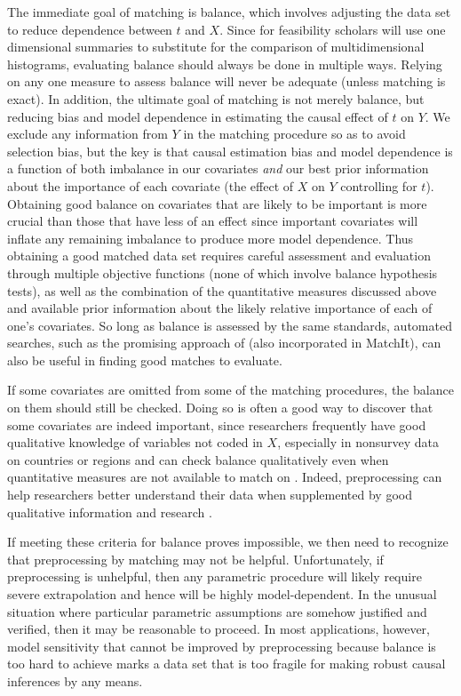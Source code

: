 \documentclass[11pt,titlepage]{article}
\begin{document}
The immediate goal of matching is balance, which involves adjusting
the data set to reduce dependence between $t$ and $X$.  Since for
feasibility scholars will use one dimensional summaries to substitute
for the comparison of multidimensional histograms, evaluating balance
should always be done in multiple ways.  Relying on any one measure to
assess balance will never be adequate (unless matching is exact).  In
addition, the ultimate goal of matching is not merely balance, but
reducing bias and model dependence in estimating the causal effect of
$t$ on $Y$.  We exclude any information from $Y$ in the matching
procedure so as to avoid selection bias, but the key is that causal
estimation bias and model dependence is a function of both imbalance
in our covariates \emph{and} our best prior information about the
importance of each covariate (the effect of $X$ on $Y$ controlling for
$t$).  Obtaining good balance on covariates that are likely to be
important is more crucial than those that have less of an effect since
important covariates will inflate any remaining imbalance to produce
more model dependence.  Thus obtaining a good matched data set
requires careful assessment and evaluation through multiple objective
functions (none of which involve balance hypothesis tests), as well as
the combination of the quantitative measures discussed above and
available prior information about the likely relative importance of
each of one's covariates.  So long as balance is assessed by the same
standards, automated searches, such as the promising approach of
\citet{DiaSek05} (also incorporated in MatchIt), can also be useful in
finding good matches to evaluate.

If some covariates are omitted from some of the matching procedures,
the balance on them should still be checked.  Doing so is often a good
way to discover that some covariates are indeed important, since
researchers frequently have good qualitative knowledge of variables
not coded in $X$, especially in nonsurvey data on countries or regions
and can check balance qualitatively even when quantitative measures
are not available to match on \citep[][Ch.3]{Rosenbaum02}.  Indeed,
preprocessing can help researchers better understand their data when
supplemented by good qualitative information and research
\citep[e.g.,][]{RosSil01}.

If meeting these criteria for balance proves impossible, we then need
to recognize that preprocessing by matching may not be helpful.
Unfortunately, if preprocessing is unhelpful, then any parametric
procedure will likely require severe extrapolation and hence will be
highly model-dependent.  In the unusual situation where particular
parametric assumptions are somehow justified and verified, then it may
be reasonable to proceed.  In most applications, however, model
sensitivity that cannot be improved by preprocessing because balance
is too hard to achieve marks a data set that is too fragile for making
robust causal inferences by any means.
\end{document}
